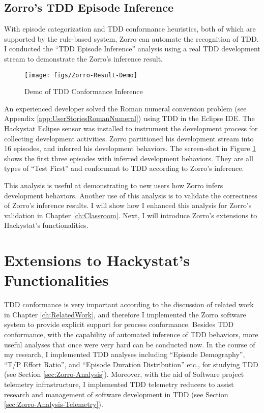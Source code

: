 \subsection{Zorro's TDD Episode Inference}
With episode categorization and TDD conformance heuristics, both 
of which are supported by the rule-based system, Zorro can automate
the recognition of TDD. 
I conducted the ``TDD Episode Inference'' analysis using a real TDD 
development stream to demonstrate the Zorro's inference result. 
\begin{figure}[htbp]
  \centering
  \texttt{[image: figs/Zorro-Result-Demo]}
  \caption{Demo of TDD Conformance Inference}
  \label{fig:Zorro-Process-Demo}
\end{figure}
An experienced developer solved the Roman numeral conversion problem 
(see Appendix \ref{app:UserStoriesRomanNumeral}) using TDD in the 
Eclipse IDE. The Hackystat Eclipse sensor was installed to instrument 
the development process for collecting development activities. Zorro 
partitioned his development stream into 16 episodes, and inferred 
his development behaviors. The screen-shot in 
Figure \ref{fig:Zorro-Process-Demo} shows the first three episodes 
with inferred development behaviors. They are all types of 
``Test First'' and conformant to TDD according to Zorro's inference.

This analysis is useful at demonstrating to new users how Zorro infers 
development behaviors. Another use of this analysis is 
to validate the correctness of Zorro's inference results. I will show 
how I enhanced this analysis for Zorro's validation in 
Chapter \ref{ch:Classroom}. Next, I will introduce Zorro's 
extensions to Hackystat's functionalities.

\section{Extensions to Hackystat's Functionalities}
TDD conformance is very important according to the discussion of related 
work in Chapter \ref{ch:RelatedWork}, and therefore I implemented 
the Zorro software system to provide explicit support for process 
conformance. Besides TDD conformance, 
with the capability of automated inference of TDD behaviors, more 
useful analyses that once were very hard can be conducted now. In 
the course of my research, I implemented TDD analyses including
``Episode Demography'', ``T/P Effort Ratio'', and 
``Episode Duration Distribution'' etc., for studying TDD 
(see Section \ref{sec:Zorro-Analysis}). Moreover, with the aid 
of Software project telemetry infrastructure, I implemented TDD 
telemetry reducers to assist research and management of software 
development in TDD (see Section \ref{sec:Zorro-Analysis-Telemetry}). 

